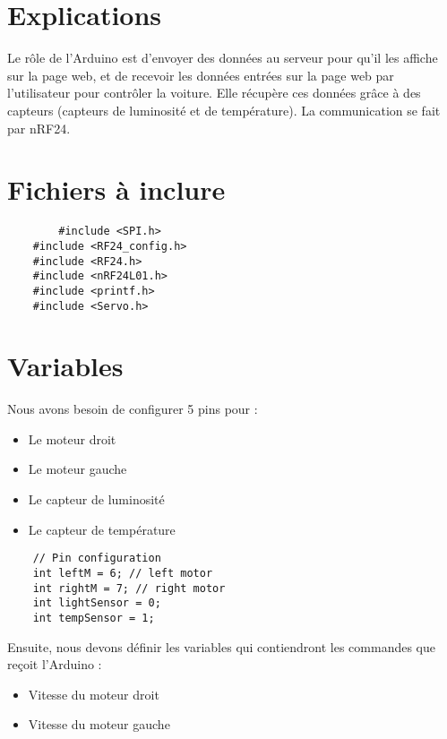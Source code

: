 \section{Explications}

Le rôle de l'Arduino est d'envoyer des données au serveur pour qu'il les affiche sur la
page web, et de recevoir les données entrées sur la page web par l'utilisateur pour contrôler
la voiture. Elle récupère ces données grâce à des capteurs (capteurs de luminosité et
de température). La communication se fait par nRF24.

\section{Fichiers à inclure}
\begin{DDbox}{\linewidth}
\begin{lstlisting}
        #include <SPI.h>
	#include <RF24_config.h>
	#include <RF24.h>
	#include <nRF24L01.h>
	#include <printf.h>
	#include <Servo.h>
\end{lstlisting}
\end{DDbox}

\section{Variables}

Nous avons besoin de configurer 5 pins pour :
\begin{itemize}
	\item Le moteur droit
	\item Le moteur gauche
	\item Le capteur de luminosité
	\item Le capteur de température
\end{itemize}
\bigbreak

\begin{DDbox}{\linewidth}
\begin{lstlisting}
	// Pin configuration
	int leftM = 6; // left motor
	int rightM = 7; // right motor
	int lightSensor = 0;
	int tempSensor = 1;

\end{lstlisting}
\end{DDbox}

Ensuite, nous devons définir les variables qui contiendront les commandes que reçoit
l'Arduino :
\begin{itemize}
	\item Vitesse du moteur droit
	\item Vitesse du moteur gauche
\end{itemize}

